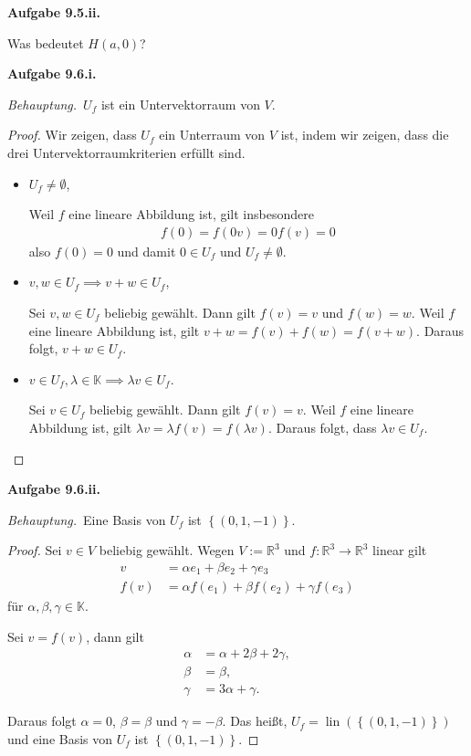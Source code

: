 \documentclass[12pt]{extarticle}
\newcommand{\mg}[1]{\mathbb{#1}}
\newcommand{\lin}{\operatorname{lin}}
\newcommand{\aufgn}[1]{\textbf{Aufgabe #1.}}
\newcommand{\beh}{\textit{Behauptung.}\ }
\begin{document}
\aufgn{9.5.ii}

Was bedeutet \(H(a,0)\)?

\aufgn{9.6.i}

\beh \(U_f\) ist ein Untervektorraum von \(V\).
\begin{proof}
  Wir zeigen, dass \(U_f\) ein Unterraum von \(V\) ist,
  indem wir zeigen, dass die drei
  Untervektorraumkriterien erfüllt sind.

\begin{itemize}
\item \(U_f \ne \emptyset\),

Weil \(f\) eine lineare Abbildung ist, gilt insbesondere
\begin{align*}
f(0) = f(0v) = 0f(v) = 0
\end{align*}
also \(f(0)=0\) und damit \(0 \in U_f\) und
\(U_f \ne \emptyset\).
\item \(v, w \in U_f \implies v + w \in U_f\),

  Sei \(v, w \in U_f\) beliebig gewählt.  Dann gilt
  \(f(v) = v\) und \(f(w) = w\).  Weil \(f\) eine lineare
  Abbildung ist, gilt \(v+w = f(v) + f(w) = f(v + w)\).
  Daraus folgt, \(v + w \in U_f\).
\item $v \in U_f, \lambda \in \mg{K} \implies \lambda v
  \in U_f$.

  Sei \(v \in U_f\) beliebig gewählt.  Dann gilt
  \(f(v) = v\).  Weil \(f\) eine lineare Abbildung ist,
  gilt \(\lambda v = \lambda f(v) = f(\lambda v)\).
  Daraus folgt, dass \(\lambda v \in U_f\).
\end{itemize}
\end{proof}

\aufgn{9.6.ii}

\beh Eine Basis von \(U_f\) ist
\(\left\{ \left( 0, 1, -1 \right) \right\}\).

\begin{proof}
  Sei \(v \in V\) beliebig gewählt.  Wegen
  \(V := \mg{R}^3\) und \(f\colon \mg{R}^3 \to \mg{R}^3\)
  linear gilt
\begin{align*}
  v &= \alpha e_1 + \beta e_2 + \gamma  e_3 \\
  f(v) &= \alpha f(e_1) + \beta f(e_2) + \gamma f(e_3)
\end{align*} für \(\alpha, \beta, \gamma \in \mg{K}\).

Sei \(v = f(v)\), dann gilt
\begin{align*}
  \alpha &= \alpha + 2 \beta + 2 \gamma, \\
  \beta &= \beta, \\
  \gamma &= 3 \alpha + \gamma.
\end{align*}

Daraus folgt \(\alpha = 0\), \(\beta = \beta\) und
\(\gamma = - \beta\).  Das heißt,
\(U_f = \lin (\left\{ (0, 1, -1) \right\})\) und eine
Basis von \(U_f\) ist \(\left\{ (0, 1, -1) \right\}\).
\end{proof}
\end{document}
